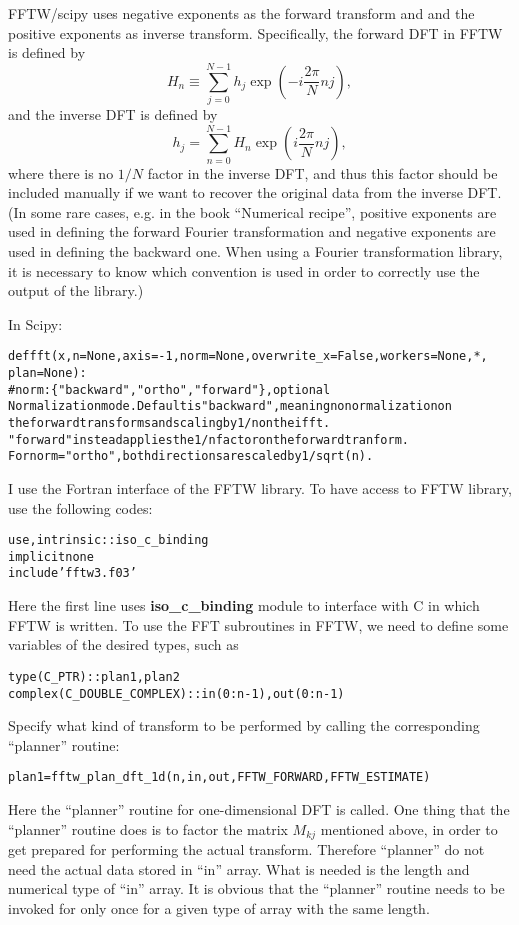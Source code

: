\documentclass{article}
\newcommand{\codestar}[1]{\textbf{#1}}
\newenvironment{tmcode}[1][]{\begin{alltt} }{\end{alltt}}
\begin{document}
FFTW/scipy uses negative exponents as the forward transform and and the
positive exponents as inverse transform. Specifically, the forward DFT in FFTW
is defined by
\begin{equation}
  H_n \equiv \sum_{j = 0}^{N - 1} h_j \exp \left( - i \frac{2 \pi}{N} n j
  \right),
\end{equation}
and the inverse DFT is defined by
\begin{equation}
  h_j = \sum_{n = 0}^{N - 1} H_n \exp \left( i \frac{2 \pi}{N} n j \right),
\end{equation}
where there is no $1 / N$ factor in the inverse DFT, and thus this factor
should be included manually if we want to recover the original data from the
inverse DFT. (In some rare cases, e.g. in the book ``Numerical
recipe''{\cite{press1992}}, positive exponents are used in defining the
forward Fourier transformation and negative exponents are used in defining the
backward one. When using a Fourier transformation library, it is necessary to
know which convention is used in order to correctly use the output of the
library.)

In Scipy:
\begin{tmcode}
def fft(x, n=None, axis=-1, norm=None, overwrite_x=False, workers=None, *,
        plan=None):
#norm : \{"backward", "ortho", "forward"\}, optional
        Normalization mode. Default is "backward", meaning no normalization on
        the forward transforms and scaling by 1/n on the ifft.
        "forward" instead applies the 1/n factor on the forward tranform.
        For norm="ortho", both directions are scaled by 1/sqrt(n).
\end{tmcode}
I use the Fortran interface of the FFTW library. To have access to FFTW
library, use the following codes:
\begin{tmcode}
use, intrinsic :: iso_c_binding
implicit none
include 'fftw3.f03'
\end{tmcode}
Here the first line uses {\codestar{iso\_c\_binding}} module to interface with
C in which FFTW is written. To use the FFT subroutines in FFTW, we need to
define some variables of the desired types, such as
\begin{tmcode}
type(C_PTR) :: plan1, plan2
complex(C_DOUBLE_COMPLEX) :: in(0:n-1), out(0:n-1)
\end{tmcode}
Specify what kind of transform to be performed by calling the corresponding
``planner'' routine:
\begin{tmcode}
plan1 = fftw_plan_dft_1d(n, in,out, FFTW_FORWARD,FFTW_ESTIMATE)
\end{tmcode}
Here the ``planner'' routine for one-dimensional DFT is called. One thing that
the ``planner'' routine does is to factor the matrix $M_{k j}$ mentioned
above, in order to get prepared for performing the actual transform. Therefore
``planner'' do not need the actual data stored in ``in'' array. What is needed
is the length and numerical type of ``in'' array. It is obvious that the
``planner'' routine needs to be invoked for only once for a given type of
array with the same length.
\end{document}
